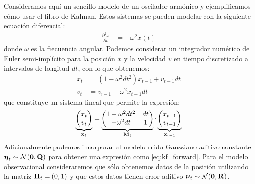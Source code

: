 Consideramos aquí un sencillo modelo de un oscilador armónico y ejemplificamos cómo usar el filtro de Kalman. Estos sistemas se pueden modelar con la siguiente ecuación diferencial:
\begin{align*}
    \frac{\partial^2 x}{\partial t} &= -\omega^2 x(t)
\end{align*}
donde $\omega$ es la frecuencia angular. Podemos considerar un integrador numérico de Euler semi-implícito para la posición $x$ y la velocidad $v$ en tiempo discretizado a intervalos de longitud $dt$, con lo que obtenemos:
\begin{align*}
    x_t &= (1 - \omega^2 dt^2) x_{t-1} + v_{t-1} dt \\
    v_t &= v_{t-1} - \omega^2 x_{t-1} dt
\end{align*}
que constituye un sistema lineal que permite la expresión:
\begin{align}
\underbrace{\begin{pmatrix*}
        x_t \\
        v_t
    \end{pmatrix*}}_{\v x_t} = 
\underbrace{\begin{pmatrix*}
        1 - \omega^2 dt^2 & dt \\
        -\omega^2 dt & 1
    \end{pmatrix*}}_{\v M_t} \cdot
\underbrace{\begin{pmatrix*}
        x_{t-1} \\
        v_{t-1}
    \end{pmatrix*}}_{\v x_{t-1}} \label{eq:oscillator_matrix_eq}
\end{align}
Adicionalmente podemos incorporar al modelo ruido Gaussiano aditivo constante $\mbox{\boldmath$ \eta $}_t \sim \mathcal{N}(\mathbf{0}, \mathbf{Q})$ para obtener una expresión como \ref{eq:kf_forward}. Para el modelo observacional consideraremos que sólo obtenemos datos de la posición utilizando la matriz $\mathbf{H}_t = (0, 1)$ y que estos datos tienen error aditivo $\mbox{\boldmath$ \nu $}_t \sim \mathcal{N}(\mathbf{0}, \mathbf{R})$.

